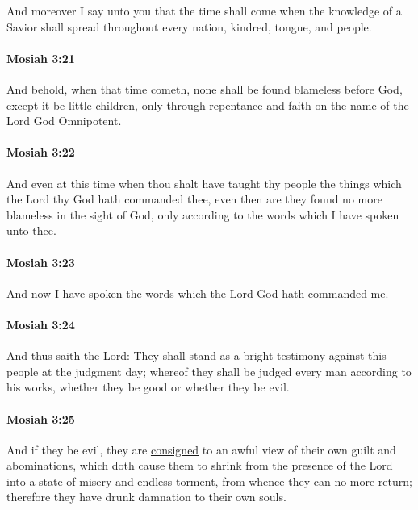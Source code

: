 			And moreover I say unto you
			that the time shall come when the knowledge of a Savior shall spread
			throughout every nation, kindred, tongue, and people.

		\paragraph{Mosiah 3:21} %
			\label{MOSIAH-3-21}

			And behold, when that time cometh,
			none shall be found blameless before God,
			except it be little children,
			only through repentance and faith on the name of the Lord God Omnipotent.

		\paragraph{Mosiah 3:22} %
			\label{MOSIAH-3-22}

			And even at this time when thou shalt have taught thy people the things
			which the Lord thy God hath commanded thee,
			even then are they found no more blameless in the sight of God,
			only according to the words which I have spoken unto thee.

		\paragraph{Mosiah 3:23} %
			\label{MOSIAH-3-23}

			And now I have spoken the words
			which the Lord God hath commanded me.

		\paragraph{Mosiah 3:24} %
			\label{MOSIAH-3-24}

			And thus saith the Lord:
			They shall stand as a bright testimony against this people at the judgment day;
			whereof they shall be judged every man according to his works,
			whether they be good or whether they be evil.

		\paragraph{Mosiah 3:25} %
			\label{MOSIAH-3-25}

			And if they be evil,
			they are \hyperref[CONSIGNATION-1828]{consigned} to an awful view of their own guilt and abominations,
			which doth cause them to shrink from the presence of the Lord
			into a state of misery and endless torment,
			from whence they can no more return;
			therefore they have drunk damnation to their own souls.

